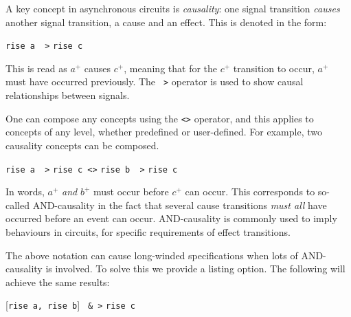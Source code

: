 \documentclass[british,conference,compsoc]{IEEEtran}
\begin{document}
A key concept in asynchronous circuits is \emph{causality}:
one signal transition \emph{causes} another signal transition, a cause and an 
effect. This is denoted in the form: 

\vspace{-1mm}

\begin{center}
{\texttt{rise a ~>} \texttt{rise c}}
\end{center}


This is read as $a^{+}$ causes $c^{+}$, meaning that for the $c^{+}$ transition 
to occur, $a^{+}$ must have occurred previously. The 
\texttt{~>}
operator is used to show causal relationships between signals.
 

One can compose any concepts using the \texttt{<>} 
operator, and this applies
to concepts of any level, whether predefined or user-defined. For example, 
two causality concepts can be composed.

\begin{center}
\texttt{rise a ~>} \texttt{rise c <>} \texttt{rise b ~>} \texttt{rise c}
\end{center}

In words, $a^{+}$ \emph{and} $b^{+}$ must occur before $c^{+}$ can occur. 
This corresponds to so-called AND-causality in the fact that several cause 
transitions \emph{must all} have occurred before an event can occur. 
AND-causality is commonly used to imply behaviours in circuits, for specific 
requirements of effect transitions.  

The above notation can cause long-winded specifications when lots of 
AND-causality is involved. To solve this we provide a listing option. The 
following will achieve the same results:

\begin{center}
      [\texttt{rise a,}\texttt{ rise b}] \texttt{~&~>} \texttt{rise c}
\end{center}
\end{document}
